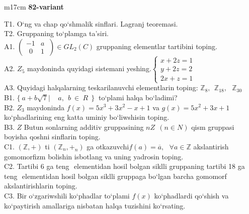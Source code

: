 \documentclass{article}
\begin{document}
\begin{tabular}{m{17cm}}
\textbf{82-variant}
\newline

T1. O`ng va chap qo`shmalik sinflari. Lagranj teoremasi. \\
T2. Gruppaning to`plamga ta'siri. \\
A1. \(\left( \begin{matrix}
 - 1 & a \\
\ \ 0 & 1
\end{matrix}\  \right) \in GL_{2}(C)\) gruppaning elementlar tartibini toping. \\
A2. \(Z_{5}\) maydoninda quyidagi sistemani yeshing.\(\left\{ \begin{matrix}
x + 2z = 1 \\
y + 2z = 2 \\
2x + z = 1
\end{matrix} \right.\ \) \\
A3. Quyidagi halqalarning teskarilanuvchi elementlarin toping: \(\mathbb{Z}_{8},\ \ \mathbb{Z}_{18},\ \ \ \mathbb{Z}_{30}\) \\
B1. \(\{\ a + b\sqrt{7}\left| \ \ \ \ \ a,\ \ b\  \in \ R\ \ \} \right.\ \) to`plami halqa bo`ladimi? \\
B2. \(Z_{3}\) maydoninda \(f(x) = 5x^{3} + 3x^{2} - x + 1\) va \(g(x) = 5x^{2} + 3x + 1\) ko`phadlarining eng katta uminiy bo`liwshisin toping. \\
B3. \(Z\) Butun sonlarning additiv gruppasining \(nZ\ \ (n \in N)\) qism gruppasi boyisha qo\textquotesingle shni sinflarin toping. \\
C1. \(\left( \mathbb{Z}, + \right)\) ti \(\left( \mathbb{Z}_{n}, +_{n} \right)\) ga o\textquotesingle tkazuvchi\(f(a) = \overline{a},\ \ \ \forall a\mathbb{\in Z}\) akslantirish gomomorfizm bolishin isbotlang va uning yadrosin toping. \\
C2. Tartibi 6 ga teng \(< a >\) elementidan hosil bo\textquotesingle lgan siklli gruppaning tartibi 18 ga teng \(< b >\) elementidan hosil bo\textquotesingle lgan siklli gruppaga bo`lgan barcha gomomorf akslantirishlarin toping. \\
C3. Bir o`zgariwshili ko`phadlar to`plami \(f(x)\) ko`phadlardi qo`shish va ko`paytirish amallariga nisbatan halqa tuzishini ko`rsating. \\

\end{tabular}
\vspace{1cm}
\end{document}
